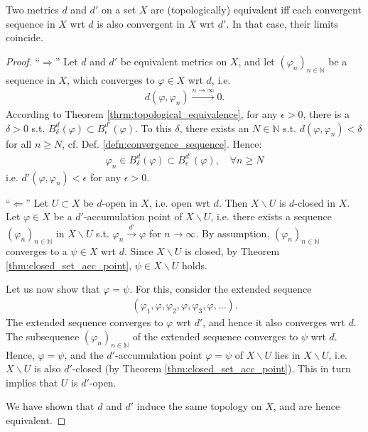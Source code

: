 \begin{theorem}
	Two metrics $d$ and $d'$ on a set $X$ are (topologically) equivalent iff each convergent sequence in $X$ wrt $d$ is also convergent in $X$ wrt $d'$. In that case, their limits coincide.
\end{theorem}

\begin{proof}
	\enquote{$\Longrightarrow$} Let $d$ and $d'$ be equivalent metrics on $X$, and let $(\varphi_n)_{n\in\mathbb N}$ be a sequence in $X$, which converges to $\varphi\in X$ wrt $d$, i.e.
	\begin{align}
		d(\varphi, \varphi_n) \overset{n\to\infty}{\longrightarrow} 0.
	\end{align}
	According to Theorem \ref{thrm:topological_equivalence}, for any $\epsilon > 0$, there is a $\delta > 0$ s.t. $B_{\delta}^{d}(\varphi) \subset B_{\epsilon}^{d'}(\varphi)$. To this $\delta$, there exists an $N\in\mathbb N$ s.t. $d(\varphi, \varphi_n) < \delta$ for all $n\geq N$, cf. Def. \ref{defn:convergence_sequence}. Hence:
	\begin{align}
		\varphi_n\in B^{d}_{\delta}(\varphi) \subset B^{d'}_{\epsilon}(\varphi), \quad \forall n\geq N
	\end{align}
	i.e. $d'(\varphi, \varphi_n) < \epsilon$ for any $\epsilon > 0$.
	
	\enquote{$\Longleftarrow$} Let $U\subset X$ be $d$-open in $X$, i.e. open wrt $d$. Then $X\backslash U$ is $d$-closed in $X$. Let $\varphi\in X$ be a $d'$-accumulation point of $X\backslash U$, i.e. there exists a sequence $(\varphi_n)_{n\in\mathbb N}$ in $X\backslash U$ s.t. $\varphi_n \overset{d'}{\longrightarrow} \varphi$ for $n\to\infty$. By assumption, $(\varphi_n)_{n\in\mathbb N}$ converges to a $\psi\in X$ wrt $d$. Since $X\backslash U$ is closed, by Theorem \ref{thm:closed_set_acc_point}, $\psi\in X\backslash U$ holds. 
	
	Let us now show that $\varphi = \psi$. For this, consider the extended sequence 
	\begin{align}
		\left(\varphi_1, \varphi, \varphi_2, \varphi, \varphi_3, \varphi, \dots\right).
	\end{align}
	The extended sequence converges to $\varphi$ wrt $d'$, and hence it also converges wrt $d$. The subsequence $(\varphi_n)_{n\in\mathbb N}$ of the extended sequence converges to $\psi$ wrt $d$. Hence, $\varphi = \psi$, and the $d'$-accumulation point $\varphi=\psi$ of $X\backslash U$ lies in $X\backslash U$, i.e. $X\backslash U$ is also $d'$-closed (by Theorem \ref{thm:closed_set_acc_point}). This in turn implies that $U$ is $d'$-open.
	
	We have shown that $d$ and $d'$ induce the same topology on $X$, and are hence equivalent.
\end{proof}

